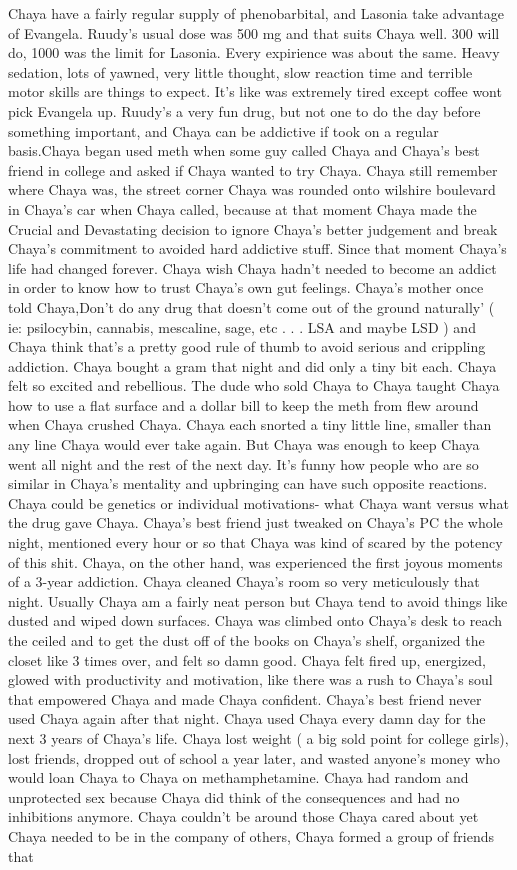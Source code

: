 \documentclass[12pt]{book}
\begin{document}
Chaya have a fairly regular supply of phenobarbital, and Lasonia take advantage of Evangela. Ruudy's usual dose was 500 mg and that suits Chaya well. 300 will do, 1000 was the limit for Lasonia. Every expirience was about the same. Heavy sedation, lots of yawned, very little thought, slow reaction time and terrible motor skills are things to expect. It's like was extremely tired except coffee wont pick Evangela up. Ruudy's a very fun drug, but not one to do the day before something important, and Chaya can be addictive if took on a regular basis.Chaya began used meth when some guy called Chaya and Chaya's best friend in college and asked if Chaya wanted to try Chaya. Chaya still remember where Chaya was, the street corner Chaya was rounded onto wilshire boulevard in Chaya's car when Chaya called, because at that moment Chaya made the Crucial and Devastating decision to ignore Chaya's better judgement and break Chaya's commitment to avoided hard addictive stuff. Since that moment Chaya's life had changed forever. Chaya wish Chaya hadn't needed to become an addict in order to know how to trust Chaya's own gut feelings. Chaya's mother once told Chaya,Don't do any drug that doesn't come out of the ground naturally' ( ie: psilocybin, cannabis, mescaline, sage, etc . . .  LSA and maybe LSD ) and Chaya think that's a pretty good rule of thumb to avoid serious and crippling addiction. Chaya bought a gram that night and did only a tiny bit each. Chaya felt so excited and rebellious. The dude who sold Chaya to Chaya taught Chaya how to use a flat surface and a dollar bill to keep the meth from flew around when Chaya crushed Chaya. Chaya each snorted a tiny little line, smaller than any line Chaya would ever take again. But Chaya was enough to keep Chaya went all night and the rest of the next day. It's funny how people who are so similar in Chaya's mentality and upbringing can have such opposite reactions. Chaya could be genetics or individual motivations- what Chaya want versus what the drug gave Chaya. Chaya's best friend just tweaked on Chaya's PC the whole night, mentioned every hour or so that Chaya was kind of scared by the potency of this shit. Chaya, on the other hand, was experienced the first joyous moments of a 3-year addiction. Chaya cleaned Chaya's room so very meticulously that night. Usually Chaya am a fairly neat person but Chaya tend to avoid things like dusted and wiped down surfaces. Chaya was climbed onto Chaya's desk to reach the ceiled and to get the dust off of the books on Chaya's shelf, organized the closet like 3 times over, and felt so damn good. Chaya felt fired up, energized, glowed with productivity and motivation, like there was a rush to Chaya's soul that empowered Chaya and made Chaya confident. Chaya's best friend never used Chaya again after that night. Chaya used Chaya every damn day for the next 3 years of Chaya's life. Chaya lost weight ( a big sold point for college girls), lost friends, dropped out of school a year later, and wasted anyone's money who would loan Chaya to Chaya on methamphetamine. Chaya had random and unprotected sex because Chaya did think of the consequences and had no inhibitions anymore. Chaya couldn't be around those Chaya cared about yet Chaya needed to be in the company of others, Chaya formed a group of friends that 
\end{document}
